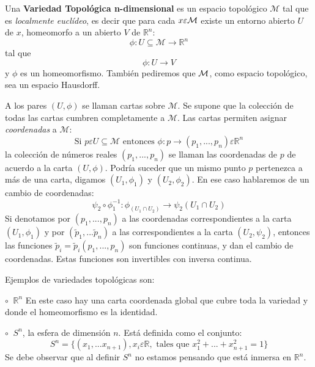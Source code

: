 \begin{definicion}
Una {\bf Variedad Topol\'ogica n-dimensional} es un espacio topol\'ogico $\mathcal{M}$ tal que es {\it localmente eucl\'ideo}, es decir que para cada $x \varepsilon {\cal{M}}$ existe un entorno abierto $U$ de $x$, homeomorfo a un abierto $V$ de $\mathbb{R}^n$:
\[
\phi: U \subseteq {\mathcal{M}} \rightarrow \mathbb{R}^n
\]
tal que
\[
\phi:U \rightarrow V
\]
y $\phi$ es un homeomorfismo. Tambi\'en pediremos que $\cal{M}$, como espacio topol\'ogico, sea un espacio Hausdorff.
\end{definicion}
A los pares $(U,\phi)$ se llaman cartas sobre $\mathcal{M}$. Se supone que la colecci\'on de todas las cartas cumbren completamente a $\mathcal{M}$. Las cartas permiten asignar {\it coordenadas} a $\mathcal{M}$:
\[
\text{Si  }p \varepsilon U \subseteq \mathcal{M} \text{   entonces  } \phi: p \rightarrow (p_1,...,p_n) \varepsilon\mathbb{R}^n  
\]
la colecci\'on de n\'umeros reales $(p_1,...,p_n)$ se llaman las coordenadas de $p$ de acuerdo a la carta $(U,\phi)$. Podr\'ia suceder que un mismo punto $p$ pertenezca a m\'as de una carta, digamos $(U_1,\phi_1)$ y $(U_2, \phi_2)$. En ese caso hablaremos de un cambio de coordenadas:
\begin{equation}\label{cc}
  \psi_2 \circ \phi_1^{-1}: \phi_(U_1 \cap U_2) \rightarrow \psi_2(U_1 \cap U_2)
\end{equation}
Si denotamos por $(p_1,...,p_n)$ a las coordenadas correspondientes a la carta $(U_1,\phi_1)$ y por $(\tilde{p}_1,...\tilde{p}_n)$ a las correspondientes a la carta $(U_2,\psi_2)$, entonces las funciones $\tilde{p}_i = \tilde{p}_i(p_1,...,p_n)$ son funciones continuas, y dan el cambio de coordenadas. Estas funciones son invertibles con inversa continua.

Ejemplos de variedades topol\'ogicas son:

$\circ \;\; \mathbb{R}^n$ En este caso hay una carta coordenada global que cubre toda la variedad y donde el homeomorfismo es la identidad.

$\circ \;\; S^n$, la esfera de dimensi\'on $n$. Est\'a definida como el conjunto:
\[
S^n = \{(x_1,...x_{n+1}), x_i \varepsilon \mathbb{R}, \text{  tales que   } x_1^2+...+x_{n+1}^2=1 \}
\]
Se debe observar que al definir $S^n$ no estamos pensando que est\'a inmersa en $\mathbb{R}^n$. 


%



